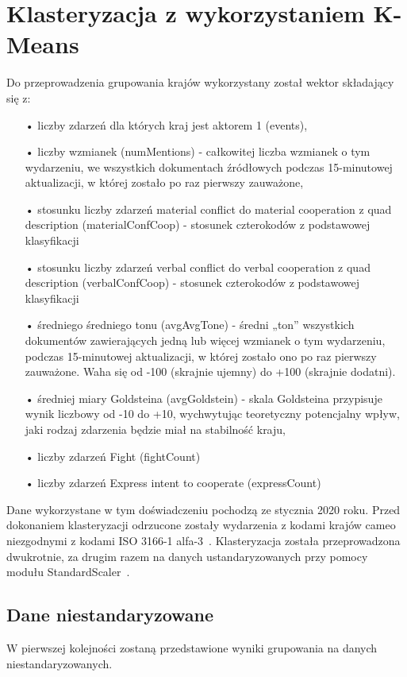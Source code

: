 \documentclass[11pt]{report}
\begin{document}
    \chapter[Klasteryzacja K-Means]{Klasteryzacja z wykorzystaniem K-Means}

    Do przeprowadzenia grupowania krajów wykorzystany został wektor składający się z:
    \begin{enumerate}
        \item[•] liczby zdarzeń dla których kraj jest aktorem 1 (events),
        \item[•] liczby wzmianek (numMentions) - całkowitej liczba wzmianek o tym wydarzeniu, we wszystkich dokumentach źródłowych podczas 15-minutowej aktualizacji, w której zostało po raz pierwszy zauważone,
        \item[•] stosunku liczby zdarzeń material conflict do material cooperation z quad description (materialConfCoop) - stosunek czterokodów z podstawowej klasyfikacji
        \item[•] stosunku liczby zdarzeń verbal conflict do verbal cooperation z quad description (verbalConfCoop) - stosunek czterokodów z podstawowej klasyfikacji
        \item[•] średniego średniego tonu (avgAvgTone) - średni „ton” wszystkich dokumentów zawierających jedną lub więcej wzmianek o tym wydarzeniu, podczas 15-minutowej aktualizacji, w której zostało ono po raz pierwszy zauważone. Waha się od -100 (skrajnie ujemny) do +100 (skrajnie dodatni).
        \item[•] średniej miary Goldsteina (avgGoldstein) - skala Goldsteina przypisuje wynik liczbowy od -10 do +10, wychwytując teoretyczny potencjalny wpływ, jaki rodzaj zdarzenia będzie miał na stabilność kraju,
        \item[•] liczby zdarzeń Fight (fightCount)
        \item[•] liczby zdarzeń Express intent to cooperate (expressCount)
    \end{enumerate}
    Dane wykorzystane w tym doświadczeniu pochodzą ze stycznia 2020 roku.
    Przed dokonaniem klasteryzacji odrzucone zostały wydarzenia z kodami krajów cameo niezgodnymi z kodami ISO 3166-1 alfa-3~\cite{iso_alfa3}.
    Klasteryzacja została przeprowadzona dwukrotnie, za drugim razem na danych ustandaryzowanych przy pomocy modułu StandardScaler~\cite{standardScaler}.


    \section{Dane niestandaryzowane}
    W pierwszej kolejności zostaną przedstawione wyniki grupowania na danych niestandaryzowanych.
\end{document}
